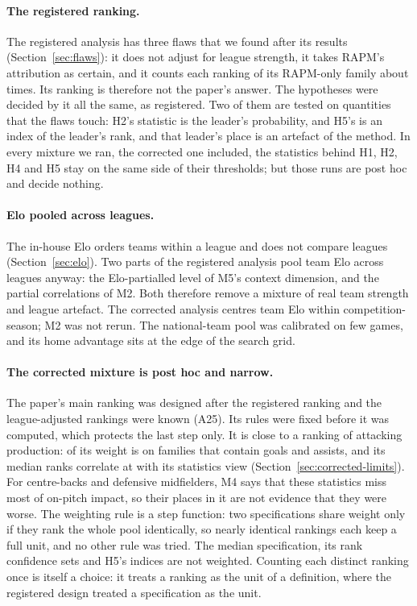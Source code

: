 \documentclass[11pt,a4paper]{article}
\begin{document}
\paragraph{The registered ranking.}
The registered analysis has three flaws that we found after its results
(Section~\ref{sec:flaws}): it does not adjust for league strength, it takes
RAPM's attribution as certain, and it counts each ranking of its RAPM-only
family about \ImpactRepeatMean{} times. Its ranking is therefore not the
paper's answer. The hypotheses were decided by it all the same, as registered.
Two of them are tested on quantities that the flaws touch: H2's statistic is
the leader's probability, and H5's is an index of the leader's rank, and that
leader's place is an artefact of the method. In every mixture we ran, the
corrected one included, the statistics behind H1, H2, H4 and H5 stay on the
same side of their thresholds; but those runs are post hoc and decide nothing.

\paragraph{Elo pooled across leagues.}
The in-house Elo orders teams within a league and does not compare leagues
(Section~\ref{sec:elo}). Two parts of the registered analysis pool team Elo
across leagues anyway: the Elo-partialled level of M5's context dimension, and
the partial correlations of M2. Both therefore remove a mixture of real team
strength and league artefact. The corrected analysis centres team Elo within
competition-season; M2 was not rerun. The national-team pool was
calibrated on few games, and its home advantage sits at the edge of the search
grid.

\paragraph{The corrected mixture is post hoc and narrow.}
The paper's main ranking was designed after the registered ranking and the
league-adjusted rankings were known (A25). Its rules were fixed before it was
computed, which protects the last step only. It is close to a ranking of
attacking production: \CorrectedWeightBoxFamilies{} of its weight is on
families that contain goals and assists, and its median ranks correlate at
\CorrectedSpearmanStatsView{} with its statistics view
(Section~\ref{sec:corrected-limits}). For centre-backs and defensive
midfielders, M4 says that these statistics miss most of on-pitch impact, so
their places in it are not evidence that they were worse. The weighting rule
is a step function: two specifications share weight only if they rank the
whole pool identically, so nearly identical rankings each keep a full unit,
and no other rule was tried. The median specification, its rank confidence
sets and H5's indices are not weighted. Counting each distinct ranking once is
itself a choice: it treats a ranking as the unit of a definition, where the
registered design treated a specification as the unit.
\end{document}
